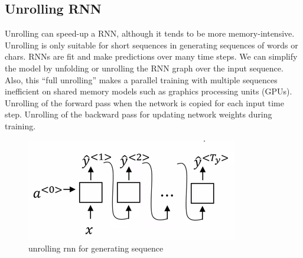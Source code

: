\subsection{Unrolling RNN}
Unrolling can speed-up a RNN, although it tends to be more memory-intensive. Unrolling is only suitable for short sequences in generating sequences of words or chars.
RNNs are fit and make predictions over many time steps. We can simplify the model by unfolding or unrolling the RNN graph over the input sequence. Also, this “full unrolling” makes a parallel training with multiple sequences inefficient on shared memory models such as graphics processing units (GPUs).\cite{web014} Unrolling of the forward pass when the network is copied for each input time step. Unrolling of the backward pass for updating network weights during training.
  \begin{figure}[H]%
    \center%
    \includegraphics[width=.8\textwidth]{images/amir/unroll_rnn.png}
    \caption[This is a unrolling rnn image]{unrolling rnn for generating sequence}\label{fig:unrolling rnn}%
  \end{figure}
